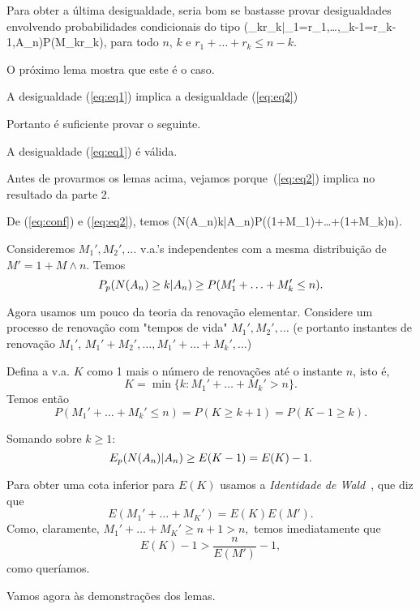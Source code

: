 Para obter a última desigualdade, seria bom se bastasse provar 
desigualdades envolvendo probabilidades condicionais do tipo 
\beq 
\label{eq:eq1} 
\p(\ro_k\leq r_k|\ro_1=r_1,\ldots,\ro_{k-1}=r_{k-1},A_n)\geq P(M_k\leq r_k), 
\eeq para todo $n$, $k$ e $r_1+\ldots+r_k\leq n-k$. 
 
O próximo lema mostra que este é o caso. 
 
\vs

\ble 
\label{le:le1} 
A desigualdade (\ref{eq:eq1}) implica a desigualdade (\ref{eq:eq2}) 
\ele 

\vs
 
Portanto é suficiente provar o seguinte. 
 
\vs

\ble 
\label{le:le2} 
A desigualdade (\ref{eq:eq1}) é válida. 
\ele 
 
\vs

Antes de provarmos os lemas acima, vejamos porque~(\ref{eq:eq2}) implica 
no resultado da parte 2. 
 
De (\ref{eq:conf}) e (\ref{eq:eq2}), temos 
\beq 
\p(N(A_n)\geq k|A_n)\geq P((1+M_1)+\ldots+(1+M_k)\leq n). 
\eeq 
 
Consideremos $M_1',M_2',\ldots$ v.a.'s independentes com a mesma distribuição de 
$M'=1+M\wedge n$. Temos 
$$ 
P_p(N(A_n)\geq k|A_n)\geq P(M_1'+\ldots+M_k'\leq n). 
$$ 
 
Agora usamos um pouco da teoria da renovação elementar. Considere um processo de 
renovação com "tempos de vida" $M_1',M_2',\ldots$ (e portanto instantes de renovação 
$M_1'$, $M_1'+M_2',\ldots,M_1'+\ldots +M_k',\ldots$) 
 
Defina a v.a. $K$ como  1 mais o número de renovações até o instante $n$, isto é, 
$$K=\min\{k:M_1'+\ldots+M_k'>n\}.$$ 
Temos então 
$$P(M_1'+\ldots+M_k'\leq n)=P(K\geq k+1)=P(K-1\geq k).$$ 
 
Somando sobre $k\geq1$: 
$$E_p(N(A_n)|A_n)\geq E(K-1)=E(K)-1.$$ 
 
Para obter uma cota inferior para $E(K)$ usamos a 
{\em Identidade de Wald}~\cite{kn:B}, que diz que 
$$E(M_1'+\ldots+M_K')=E(K)E(M').$$ 
Como, claramente, $M_1'+\ldots+M_K'\geq n+1>n,$ temos imediatamente que 
$$E(K)-1>\frac{n}{E(M')}-1,$$ 
como queríamos. 
 
Vamos agora às demonstrações dos lemas. 
 
\vs

